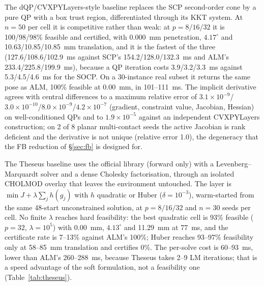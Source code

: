 The dQP/CVXPYLayers-style baseline \cite{magoon2025dqp,agrawal2019cvxpylayers} replaces the SCP second-order cone by a pure QP with a box trust region, differentiated through its KKT system. At $n=50$ per cell it is competitive rather than weak: at $p=8/16/32$ it is 100/98/98\% feasible and certified, with 0.000~mm penetration, $4.17^\circ$ and 10.63/10.85/10.85~mm translation, and it is the fastest of the three (127.6/108.6/102.9~ms against SCP's 154.2/128.0/132.3~ms and ALM's 233.4/225.8/199.9~ms), because a QP iteration costs 3.9/3.2/3.3~ms against 5.3/4.5/4.6~ms for the SOCP. On a 30-instance real subset it returns the same pose as ALM, 100\% feasible at 0.00~mm, in 101--111~ms. The implicit derivative agrees with central differences to a maximum relative error of $3.1\times10^{-9}$/$3.0\times10^{-10}$/$8.0\times10^{-9}$/$4.2\times10^{-7}$ (gradient, constraint value, Jacobian, Hessian) on well-conditioned QPs and to $1.9\times10^{-5}$ against an independent CVXPYLayers construction; on 2 of 8 planar multi-contact seeds the active Jacobian is rank deficient and the derivative is not unique (relative error 1.0), the degeneracy that the FB reduction of \S\ref{sec:fb} is designed for.

The Theseus baseline uses the official library \cite{pineda2022theseus} (forward only) with a Levenberg--Marquardt solver and a dense Cholesky factorisation, through an isolated CHOLMOD overlay that leaves the environment untouched. The layer is $\min J+\lambda\sum_j h(g_j)$ with $h$ quadratic or Huber ($\delta=10^{-3}$), warm-started from the same 48-start unconstrained solution, at $p=8/16/32$ and $n=30$ seeds per cell. No finite $\lambda$ reaches hard feasibility: the best quadratic cell is 93\% feasible ($p=32$, $\lambda=10^5$) with 0.00~mm, $4.13^\circ$ and 11.29~mm at 77~ms, and the certificate rate is 7--13\% against ALM's 100\%; Huber reaches 93--97\% feasibility only at 58--85~mm translation and certifies 0\%. The per-solve cost is 60--93~ms, lower than ALM's 260--288~ms, because Theseus takes 2--9 LM iterations; that is a speed advantage of the soft formulation, not a feasibility one (Table~\ref{tab:theseus}).

